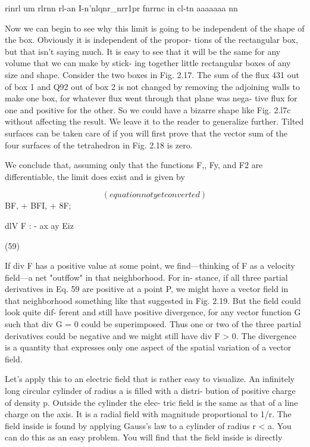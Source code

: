 rinrl um rlrnn rl-an I-n'nlqnr_nrr1pr fnrrnc in cl-tn aaaaaaa nn

Now we can begin to see why this limit is going to be independent
of the shape of the box. Obviously it is independent of the propor-
tions of the rectangular box, but that isn't saying much. It is easy to
see that it will be the same for any volume that we can make by stick-
ing together little rectangular boxes of any size and shape. Consider
the two boxes in Fig. 2.17. The sum of the flux 431 out of box 1 and
Q92 out of box 2 is not changed by removing the adjoining walls to
make one box, for whatever flux went through that plane was nega-
tive flux for one and positive for the other. So we could have a
bizarre shape like Fig. 2.l7c without affecting the result. We leave it
to the reader to generalize further. Tilted surfaces can be taken care
of if you will first prove that the vector sum of the four surfaces of the
tetrahedron in Fig. 2.18 is zero.

We conclude that, assuming only that the functions F,, Fy, and F2
are differentiable, the limit does exist and is given by

\begin{equation}
(equation not yet converted)
\end{equation}
BF, + BFI, + 8F;

dlV F : -
ax ay Eiz

(59)

If div F has a positive value at some point, we find---thinking of F
as a velocity field---a net "outffow" in that neighborhood. For in-
stance, if all three partial derivatives in Eq. 59 are positive at a
point P, we might have a vector field in that neighborhood something
like that suggested in Fig. 2.19. But the field could look quite dif-
ferent and still have positive divergence, for any vector function G
such that div G = 0 could be superimposed. Thus one or two of the
three partial derivatives could be negative and we might still have
div F > 0. The divergence is a quantity that expresses only one
aspect of the spatial variation of a vector field.

Let's apply this to an electric field that is rather easy to visualize.
An infinitely long circular cylinder of radius a is filled with a distri-
bution of positive charge of density p. Outside the cylinder the elec-
tric field is the same as that of a line charge on the axis. It is a radial
field with magnitude proportional to 1/r. The field inside is found
by applying Gauss's law to a cylinder of radius r < a. You can do
this as an easy problem. You will find that the field inside is directly


